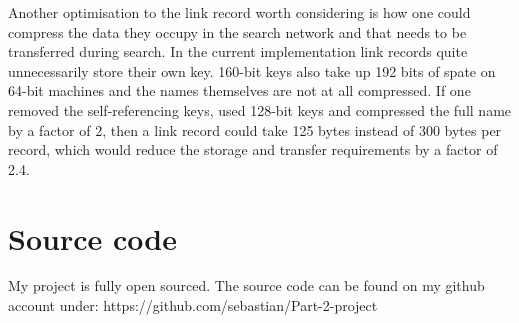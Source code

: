 \mbox{}

Another optimisation to the link record worth considering is how one could compress the data they occupy in the search network and that needs to be transferred during search.
In the current implementation link records quite unnecessarily store their own key. 160-bit keys also take up 192 bits of spate on 64-bit machines and the names themselves are not at all compressed.
If one removed the self-referencing keys, used 128-bit keys and compressed the full name by a factor of 2, then a link record could take 125 bytes instead of 300 bytes per record, which would reduce the storage and transfer requirements by a factor of 2.4. 


\chapter{Source code}
My project is fully open sourced. The source code can be found on my github account under: https://github.com/sebastian/Part-2-project

% 
% 
% 
